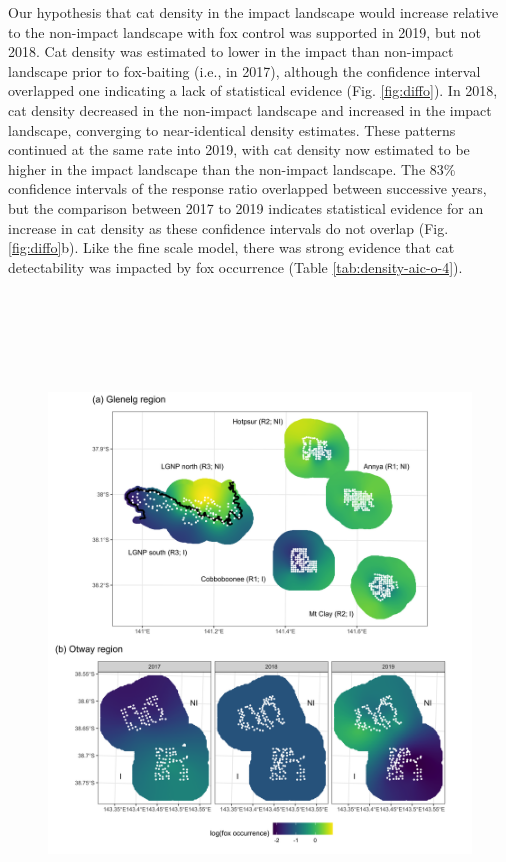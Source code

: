 \documentclass[11pt,a4paper,titlepage,twoside,openright]{style/unimelbthesis}
\begin{document}
\begin{mainmatter}
Our hypothesis that cat density in the impact landscape would increase relative to the non-impact landscape with fox control was supported in 2019, but not 2018. Cat density was estimated to lower in the impact than non-impact landscape prior to fox-baiting (i.e., in 2017), although the confidence interval overlapped one indicating a lack of statistical evidence (Fig. \ref{fig:diffo}). In 2018, cat density decreased in the non-impact landscape and increased in the impact landscape, converging to near-identical density estimates. These patterns continued at the same rate into 2019, with cat density now estimated to be higher in the impact landscape than the non-impact landscape. The 83\% confidence intervals of the response ratio overlapped between successive years, but the comparison between 2017 to 2019 indicates statistical evidence for an increase in cat density as these confidence intervals do not overlap (Fig. \ref{fig:diffo}b). Like the fine scale model, there was strong evidence that cat detectability was impacted by fox occurrence (Table \ref{tab:density-aic-o-4}).

\newpage

\(~\)

\(~\)

\(~\)
\begin{figure}

{\centering \includegraphics[width=1\linewidth]{figure/fox_occ_map} 

}
\end{figure}
\end{mainmatter}
\end{document}
